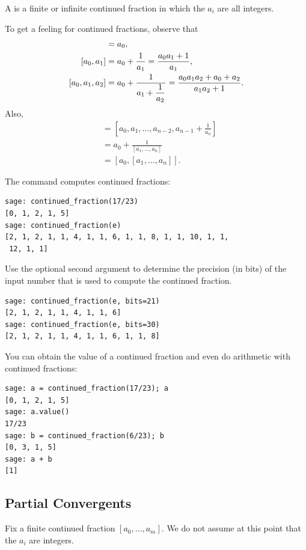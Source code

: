 \begin{definition}
A  is a finite or infinite continued
fraction in which the $a_i$ are all integers.
\end{definition}

To get a feeling for continued fractions, observe that
\begin{align*}
[a_0] &= a_0,\\
[a_0, a_1] &= a_0 + \frac{1}{a_1} = \frac{a_0 a_1 + 1}{a_1},\\
[a_0, a_1, a_2] &= a_0 + \frac{1}{a_1 +\ds \frac{1}{a_2}}
            = \frac{a_0 a_1 a_2 + a_0 + a_2}{a_1 a_2 + 1}.
\end{align*}
Also,
\begin{align*}
  [a_0, a_1, \ldots ,a_{n-1}, a_n] &=
          \left[a_0, a_1, \ldots, a_{n-2}, a_{n-1} + \frac{1}{a_n}\right]\\
        &= a_0 + \frac{1}{[a_1,\ldots, a_n]} \\
        &= [a_0, [a_1,\ldots, a_n]].
\end{align*}

\begin{sg}
The  command  computes
continued fractions:
\begin{verbatim}
sage: continued_fraction(17/23)
[0, 1, 2, 1, 5]
sage: continued_fraction(e)
[2, 1, 2, 1, 1, 4, 1, 1, 6, 1, 1, 8, 1, 1, 10, 1, 1,
 12, 1, 1]
\end{verbatim}
Use the optional second argument  to determine the
precision (in bits) of the input number that is used to compute the
continued fraction.
\begin{verbatim}
sage: continued_fraction(e, bits=21)
[2, 1, 2, 1, 1, 4, 1, 1, 6]
sage: continued_fraction(e, bits=30)
[2, 1, 2, 1, 1, 4, 1, 1, 6, 1, 1, 8]
\end{verbatim}
You can obtain the value of a continued fraction
and even do arithmetic with continued fractions:
\begin{verbatim}
sage: a = continued_fraction(17/23); a
[0, 1, 2, 1, 5]
sage: a.value()
17/23
sage: b = continued_fraction(6/23); b
[0, 3, 1, 5]
sage: a + b
[1]
\end{verbatim}
\end{sg}

\subsection{Partial Convergents}\label{sec:partconv}
%
Fix a finite continued fraction $[a_0,\ldots,a_m]$.  We do not assume
at this point that the $a_i$ are integers.

